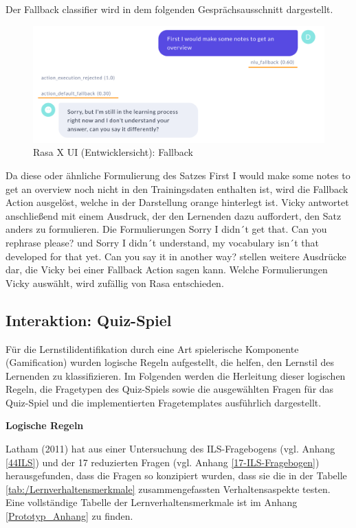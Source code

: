 Der Fallback classifier
wird in dem folgenden Gesprächsausschnitt dargestellt.
\begin{figure}[H]
  \centering
  \includegraphics[width=0.85\linewidth]{images/Fallback.png}
  \caption[Rasa X UI (Entwicklersicht): Fallback]{Rasa X UI (Entwicklersicht): Fallback}
  \label{fig:Fallback}
\end{figure} 
Da diese oder ähnliche Formulierung des Satzes 
\glqq First I would make some notes to get an overview\grqq{} 
noch nicht in den Trainingsdaten 
enthalten ist, wird die Fallback Action ausgelöst, welche in der Darstellung 
orange hinterlegt ist. Vicky antwortet anschließend mit einem Ausdruck, der den
Lernenden dazu auffordert, den Satz anders zu formulieren. 
Die Formulierungen \glqq Sorry I didn´t get that. Can you rephrase please?\grqq{}  und \glqq Sorry I didn´t understand, my vocabulary isn´t that developed for that yet. Can you say it in another way?\grqq{} 
stellen weitere Ausdrücke dar, die Vicky bei einer Fallback Action sagen kann. 
Welche Formulierungen Vicky auswählt, wird zufällig von Rasa entschieden.

\subsection{Interaktion: Quiz-Spiel}
Für die Lernstilidentifikation durch eine Art spielerische Komponente (Gamification) wurden
logische Regeln aufgestellt, die helfen, den Lernstil des Lernenden zu klassifizieren.
Im Folgenden werden die Herleitung dieser logischen Regeln, die Fragetypen des 
Quiz-Spiels sowie die ausgewählten Fragen für das Quiz-Spiel und die implementierten
Fragetemplates ausführlich dargestellt.
\pagebreak

\textbf{Logische Regeln}

Latham (2011) hat aus einer Untersuchung 
des ILS-Fragebogens (vgl. Anhang \ref{44ILS}) und der 17 reduzierten Fragen (vgl. Anhang \ref{17-ILS-Fragebogen}) 
herausgefunden, dass 
die Fragen so konzipiert wurden, dass sie die in der Tabelle \ref{tab:/Lernverhaltensmerkmale}
zusammengefassten Verhaltensaspekte testen. Eine vollständige Tabelle der Lernverhaltensmerkmale ist im Anhang \ref{Prototyp_Anhang} zu finden.

